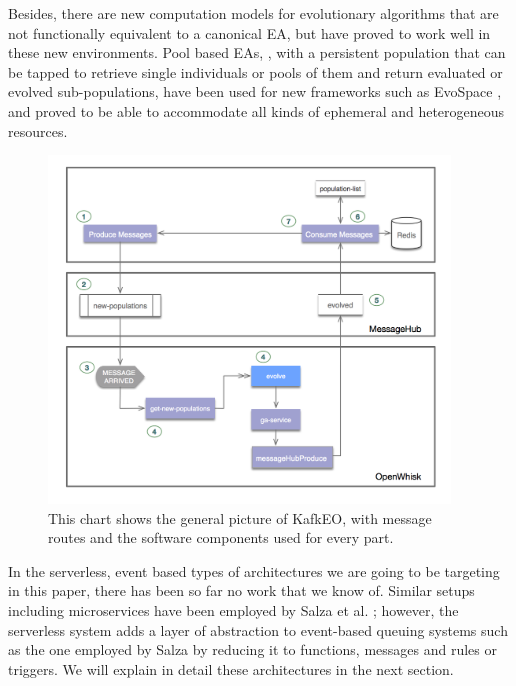 \documentclass[sigconf]{acmart}
\begin{document}
Besides, there are new computation models for evolutionary algorithms
that are not functionally equivalent to a canonical EA, but have
proved to work well in these new environments. Pool based EAs,
\cite{bollini1999distributed}, with a persistent population that can
be tapped to retrieve single individuals or pools of them and return
evaluated or evolved sub-populations, have been used for new
frameworks such as EvoSpace \cite{García-Valdez2015}, and proved to be
able to accommodate all kinds of ephemeral and heterogeneous
resources. 

\begin{figure}[t!bp]
\includegraphics[width=0.95\textwidth]{img/kafka.png}
\caption{This chart shows the general picture of KafkEO, with message
  routes and the software components used for every part.}
\label{fig:kafkeo}
\end{figure}
%
In the serverless, event based types of architectures we are going to
be targeting in this paper, there has been so far no work that we know
of. Similar setups including microservices have been employed by Salza et
al. \cite{salza2017ccube}; however, the serverless system adds a layer
of abstraction to event-based queuing systems such as the one employed
by Salza by reducing it to functions, messages and rules or
triggers. We will explain in detail these architectures in the next
section.
\end{document}
